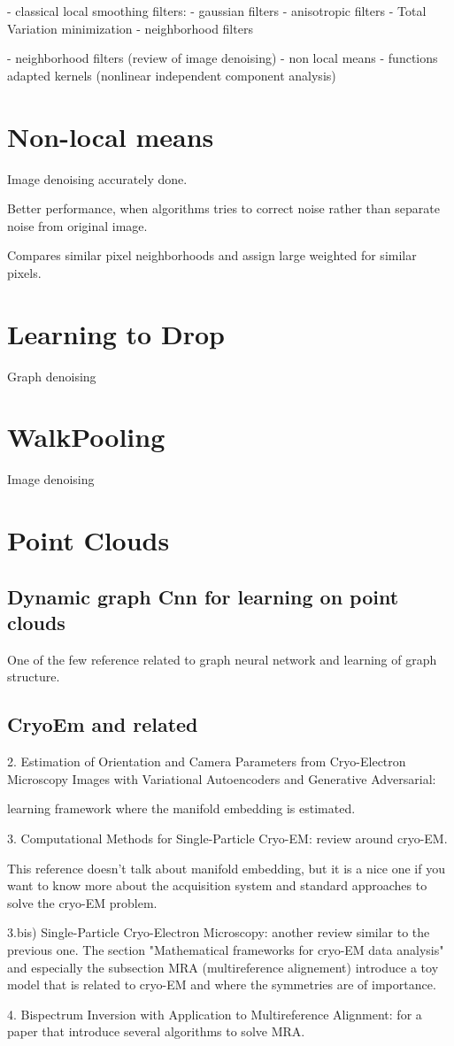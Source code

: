 - classical local smoothing filters:
    - gaussian filters
    - anisotropic filters
    - Total Variation minimization
    - neighborhood filters

- neighborhood filters (review of image denoising)
- non local means
- functions adapted kernels (nonlinear independent component analysis)


\section{Non-local means}
Image denoising accurately done.

Better performance, when algorithms tries to correct noise rather than separate noise
from original image.

Compares similar pixel neighborhoods and assign large weighted for similar pixels.




\section{Learning to Drop}
Graph denoising


\section{WalkPooling}
Image denoising

\section{Point Clouds}
\subsection{Dynamic graph Cnn for learning on point clouds}
One of the few reference related to graph neural network and learning of graph structure. 


\subsection{CryoEm and related}
2. Estimation of Orientation and Camera Parameters from Cryo-Electron Microscopy Images with Variational Autoencoders and Generative Adversarial: 

learning framework where the manifold embedding is estimated.

3. Computational Methods for Single-Particle Cryo-EM: 
review around cryo-EM. 

This reference doesn't talk about manifold embedding, but it is a nice one if you want to know more about 
the acquisition system and standard approaches to solve the cryo-EM problem.


3.bis) Single-Particle Cryo-Electron Microscopy: 
another review similar to the previous one. The section "Mathematical frameworks for cryo-EM data analysis" 
and especially the subsection MRA (multireference alignement) introduce 
a toy model that is related to cryo-EM and where the symmetries are of importance. 

4. Bispectrum Inversion with Application to Multireference Alignment: 
for a paper that introduce several algorithms to solve MRA.